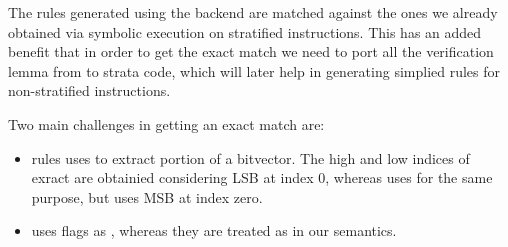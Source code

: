 The \K rules generated using the backend are matched against the ones we already
obtained via symbolic execution on stratified instructions.  This has an added
benefit that in order to get the exact match we need to port all the
verification lemma from \K to strata code, which will later help in generating
simplied \K rules for non-stratified instructions.


Two main challenges in getting an exact match are:
\begin{itemize}

\item  \Strata rules uses \extract to extract portion of a bitvector. The high
and low indices of exract are obtainied considering LSB at index 0, whereas \K
uses \extractMInt for the same purpose, but uses MSB at index zero.

\item  \Strata uses flags as \bool, whereas they are treated as \bv in our
semantics.

\end{itemize}


